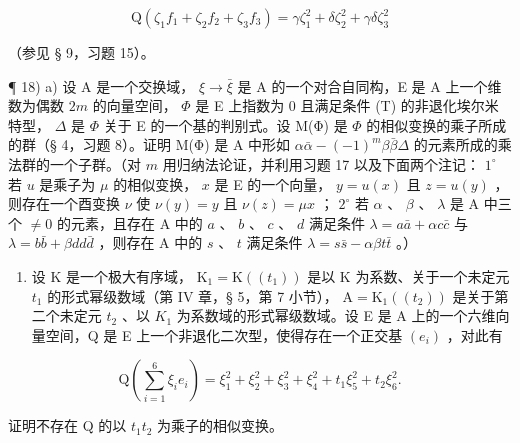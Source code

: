 \[
\mathrm{Q} \left(\zeta_ {1} f _ {1} + \zeta_ {2} f _ {2} + \zeta_ {3} f _ {3}\right) = \gamma \zeta_ {1} ^ {2} + \delta \zeta_ {2} ^ {2} + \gamma \delta \zeta_ {3} ^ {2}
\]

（参见 § 9，习题 15）。

¶ 18) a) 设 A 是一个交换域， \(\xi \to \bar{\xi}\) 是 A 的一个对合自同构，E 是 A 上一个维数为偶数 \(2m\) 的向量空间， \(\Phi\) 是 E 上指数为 0 且满足条件 (T) 的非退化埃尔米特型， \(\Delta\) 是 \(\Phi\) 关于 E 的一个基的判别式。设 M(Φ) 是 \(\Phi\) 的相似变换的乘子所成的群（§ 4，习题 8）。证明 M(Φ) 是 A 中形如 \(\alpha\bar{\alpha} - (-1)^{m}\beta\bar{\beta}\Delta\) 的元素所成的乘法群的一个子群。（对 \(m\) 用归纳法论证，并利用习题 17 以及下面两个注记： \(1^{\circ}\) 若 \(u\) 是乘子为 \(\mu\) 的相似变换， \(x\) 是 E 的一个向量， \(y = u(x)\) 且 \(z = u(y)\) ，则存在一个酉变换 \(\nu\) 使 \(\nu(y) = y\) 且 \(\nu(z) = \mu x\) ； \(2^{\circ}\) 若 \(\alpha\) 、 \(\beta\) 、 \(\lambda\) 是 A 中三个 \(\neq 0\) 的元素，且存在 A 中的 \(a\) 、 \(b\) 、 \(c\) 、 \(d\) 满足条件 \(\lambda = a\bar{a} + \alpha c\bar{c}\) 与 \(\lambda = b\bar{b} + \beta dd\bar{d}\) ，则存在 A 中的 \(s\) 、 \(t\) 满足条件 \(\lambda = s\bar{s} - \alpha\beta t\bar{t}\) 。）

\begin{enumerate}
\def\labelenumi{\alph{enumi})}
\setcounter{enumi}{1}
\tightlist
\item
  设 K 是一个极大有序域， \(\mathrm{K}_{1} = \mathrm{K}((t_{1}))\) 是以 K 为系数、关于一个未定元 \(t_{1}\) 的形式幂级数域（第 IV 章，§ 5，第 7 小节）， \(\mathrm{A} = \mathrm{K}_{1}((t_{2}))\) 是关于第二个未定元 \(t_{2}\) 、以 \(K_{1}\) 为系数域的形式幂级数域。设 E 是 A 上的一个六维向量空间，Q 是 E 上一个非退化二次型，使得存在一个正交基 \((e_{i})\) ，对此有
\end{enumerate}

\[
\mathrm{Q} (\sum_ {i = 1} ^ {6} \xi_ {i} e _ {i}) = \xi_ {1} ^ {2} + \xi_ {2} ^ {2} + \xi_ {3} ^ {2} + \xi_ {4} ^ {2} + t _ {1} \xi_ {5} ^ {2} + t _ {2} \xi_ {6} ^ {2}.
\]

证明不存在 Q 的以 \(t_{1}t_{2}\) 为乘子的相似变换。

\backmatter
